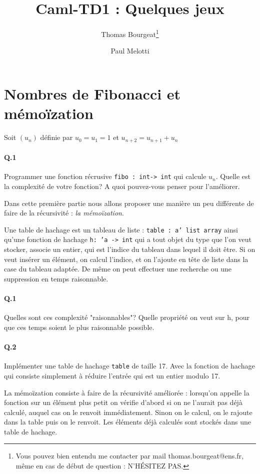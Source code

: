 \documentclass[10pt,a4paper]{article}
\begin{document}
\title{Caml-TD1 : Quelques jeux}
\author{Thomas Bourgeat\footnote{Vous pouvez bien entendu me contacter par mail thomas.bourgeat@ens.fr, même en cas de début de question : N'HÉSITEZ PAS.}\and Paul Melotti}
\maketitle{}

\section{Nombres de Fibonacci et mémoïzation}
Soit $(u_n)$ définie par $u_0=u_1=1$ et $u_{n+2}=u_{n+1}+u_n$
\paragraph{Q.1} Programmer une fonction récrusive \texttt{fibo : int-> int} qui calcule $u_n$. Quelle est la complexité de votre fonction? A quoi pouvez-vous penser pour l'améliorer.

Dans cette première partie nous allons proposer une manière un peu différente de faire de la récursivité : \emph{la mémoïzation}.

Une table de hachage est un tableau de liste : \texttt{table : a' list array} ainsi qu'une fonction de hachage \texttt{h: 'a -> int} qui a tout objet du type que l'on veut stocker, associe un entier, qui est l'indice du tableau dans lequel il doit être. Si on veut insérer un élément, on calcul l'indice, et on l'ajoute en tête de liste dans la case du tableau adaptée. De même on peut effectuer une recherche ou une suppression en temps raisonnable.

\paragraph{Q.1}Quelles sont ces complexité "raisonnables"? Quelle propriété on veut sur h, pour que ces temps soient le plus raisonnable possible.

\paragraph{Q.2} Implémenter une table de hachage \texttt{table} de taille 17. Avec la fonction de hachage qui consiste simplement à réduire l'entrée qui est un entier modulo 17.



La mémoïzation consiste à faire de la récursivité améliorée : lorsqu'on appelle la fonction sur un élément plus petit on vérifie d'abord si on ne l'aurait pas déjà calculé, auquel cas on le renvoit immédiatement. Sinon on le calcul, on le rajoute dans la table puis on le renvoit. Les éléments déjà calculés sont stockés dans une table de hachage.
\end{document}
